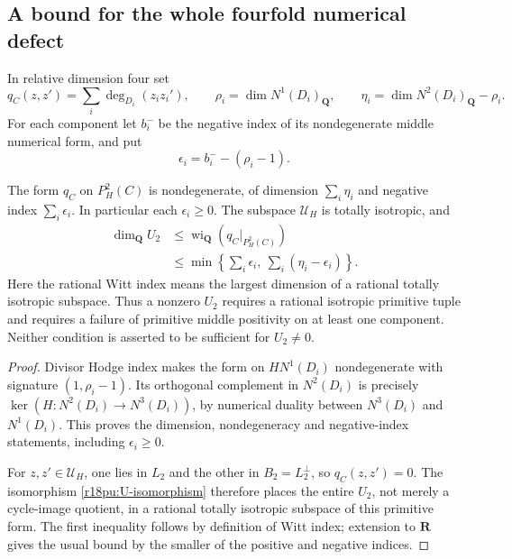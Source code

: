 \subsection{A bound for the whole fourfold numerical defect}

In relative dimension four set
\[
 q_C(z,z')=\sum_i\deg_{D_i}(z_i z_i'),\qquad
 \rho_i=\dim N^1(D_i)_{\mathbf Q},\qquad
 \eta_i=\dim N^2(D_i)_{\mathbf Q}-\rho_i .
 \tag{PU18.13}\label{r18pu:fourfold-form}
\]
For each component let $b_i^-$ be the negative index of its
nondegenerate middle numerical form, and put
\[
                          \epsilon_i=b_i^--(\rho_i-1).
 \tag{PU18.14}\label{r18pu:excess-negative}
\]

\begin{corollary}
\label{r18pu:Witt}
The form $q_C$ on $P_H^2(C)$ is nondegenerate, of dimension
$\sum_i\eta_i$ and negative index $\sum_i\epsilon_i$.
In particular each $\epsilon_i\ge0$.
The subspace $\mathscr U_H$ is totally isotropic, and
\[
 \begin{split}
 \dim_{\mathbf Q}U_2
  &\le \operatorname{wi}_{\mathbf Q}(q_C|_{P_H^2(C)})\\
  &\le \min\left\{\sum_i\epsilon_i,\
                         \sum_i(\eta_i-\epsilon_i)\right\}.
 \end{split}
 \tag{PU18.15}\label{r18pu:Witt-bound}
\]
Here the rational Witt index means the largest dimension
of a rational totally isotropic subspace.
Thus a nonzero $U_2$ requires a rational isotropic primitive
tuple and requires a failure of primitive middle positivity
on at least one component.  Neither condition is asserted
to be sufficient for $U_2\ne0$.
\end{corollary}

\begin{proof}
Divisor Hodge index makes the form on $HN^1(D_i)$
nondegenerate with signature $(1,\rho_i-1)$.
Its orthogonal complement in $N^2(D_i)$ is precisely
$\ker(H:N^2(D_i)\to N^3(D_i))$, by numerical duality
between $N^3(D_i)$ and $N^1(D_i)$.
This proves the dimension, nondegeneracy and negative-index
statements, including $\epsilon_i\ge0$.

For $z,z'\in\mathscr U_H$, one lies in $L_2$ and the
other in $B_2=L_2^\perp$, so $q_C(z,z')=0$.
The isomorphism \eqref{r18pu:U-isomorphism} therefore
places the entire $U_2$, not merely a cycle-image quotient,
in a rational totally isotropic subspace of this primitive
form.  The first inequality follows by definition of
Witt index; extension to $\mathbf R$ gives the usual bound
by the smaller of the positive and negative indices.
\end{proof}


